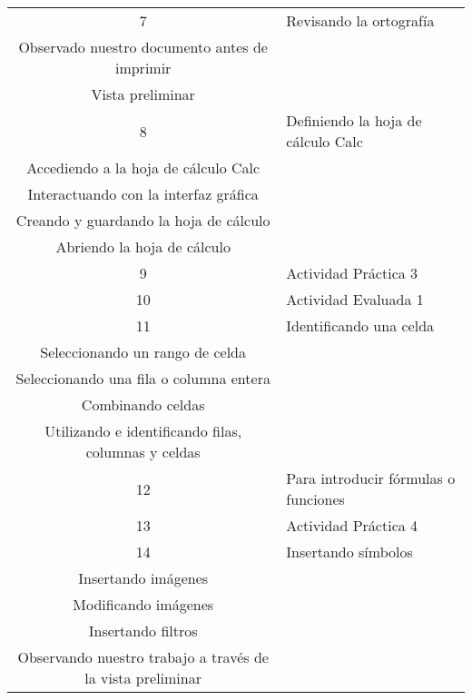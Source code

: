 \begin{center}
\begin{tabular}{|c|p{10cm}|}
                    \end{tabular}     
                    
                    \begin{tabular}{|c|p{10cm}|}\hline 
                        
                        7 & \raggedright Revisando la ortografía
                        \\ Observado nuestro documento antes de imprimir
                        \\ Vista preliminar
                        \tabularnewline \hline

                        8 & \raggedright Definiendo la hoja de cálculo Calc
                        \\ Accediendo a la hoja de cálculo Calc
                        \\ Interactuando con la interfaz gráfica
                        \\ Creando y guardando la hoja de cálculo
                        \\ Abriendo la hoja de cálculo
                        \tabularnewline \hline
                                   
                        9 & \raggedright Actividad Práctica 3
                        \tabularnewline \hline
                        
                        10 & \raggedright Actividad Evaluada 1
                        \tabularnewline \hline
                        
                        11 & \raggedright Identificando una celda
                        \\ Seleccionando un rango de celda
                        \\ Seleccionando una fila o columna entera
                        \\ Combinando celdas
                        \\ Utilizando e identificando filas, columnas y celdas
                        \tabularnewline \hline
                        12 & \raggedright Para introducir fórmulas o funciones
                        \tabularnewline \hline
                        

                        
                        13 & \raggedright Actividad Práctica 4
                        \tabularnewline \hline
                        
                        14 & \raggedright Insertando símbolos
                        \\ Insertando imágenes
                        \\ Modificando imágenes
                        \\ Insertando filtros
                        \\ Observando nuestro trabajo a través de la vista preliminar
                        \tabularnewline \hline
                        

\end{tabular}
\end{center}
